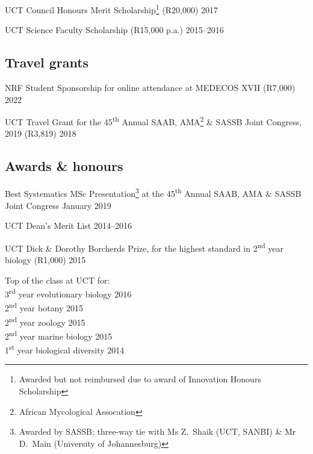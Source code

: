 \documentclass[10pt]{article}
\begin{document}
UCT Council Honours Merit Scholarship\footnote{Awarded but not
  reimbursed due to award of Innovation Honours Scholarship}
  (R20,000)                                                          \hfill 2017

UCT Science Faculty Scholarship (R15,000 p.a.)                 \hfill 2015--2016

\subsection*{Travel grants}

NRF Student Sponsorship for online attendance at MEDECOS XVII
  (R7,000)                                                           \hfill 2022

UCT Travel Grant for the 45\textsuperscript{th} Annual SAAB,
  AMA\footnote{African Mycological Assocation} \& SASSB Joint
  Congress, 2019 (R3,819)                                            \hfill 2018

\subsection*{Awards \& honours}

Best Systematics MSc Presentation\footnote{Awarded by SASSB;
  three-way tie with Ms Z.~Shaik (UCT, SANBI) \& Mr D.~Main
  (University of Johannesburg)} at the 45\textsuperscript{th}
  Annual SAAB, AMA \& SASSB Joint Congress                   \hfill January 2019

UCT Dean's Merit List                                          \hfill 2014--2016

UCT Dick \& Dorothy Borcherds Prize, for the highest standard in 
  2\textsuperscript{nd} year biology (R1,000)                        \hfill 2015

Top of the class at UCT for: \\
\hspace{2em} 3\textsuperscript{rd} year evolutionary biology      \hfill 2016 \\
\hspace{2em} 2\textsuperscript{nd} year botany                    \hfill 2015 \\
\hspace{2em} 2\textsuperscript{nd} year zoology                   \hfill 2015 \\
\hspace{2em} 2\textsuperscript{nd} year marine biology            \hfill 2015 \\
\hspace{2em} 1\textsuperscript{st} year biological diversity      \hfill 2014 \\
\end{document}
